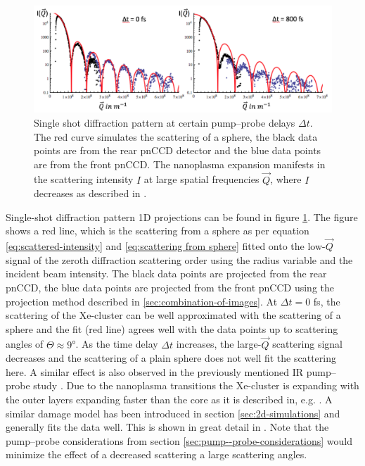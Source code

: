 \begin{figure}
	\centering
		\includegraphics[width=1.0\textwidth]{images/results/Xe-diff-pattern.png}
	\caption[Single-shot diffraction pattern of Xe-cluster at varying time delays]{Single shot diffraction pattern at certain pump--probe delays $\Delta t$. The red curve simulates the scattering of a sphere, the black data points are from the rear pnCCD detector and the blue data points are from the front pnCCD. The nanoplasma expansion manifests in the scattering intensity $I$ at large spatial frequencies $\vec{Q}$, where $I$ decreases as described in \citep{Gorkhover-2016-NatPho}.}
	\label{fig:Xe-only-diff-pattern}
\end{figure}
Single-shot diffraction pattern 1D projections can be found in figure \ref{fig:Xe-only-diff-pattern}. The figure shows a red line, which is the scattering from a sphere as per equation \eqref{eq:scattered-intensity} and \eqref{eq:scattering from sphere} fitted onto the low-$\vec{Q}$ signal of the zeroth diffraction scattering order using the radius variable and the incident beam intensity. The black data points are projected from the rear pnCCD, the blue data points are projected from the front pnCCD using the projection method described in \ref{sec:combination-of-images}. At $\Delta t=0$ fs, the scattering of the Xe-cluster can be well approximated with the scattering of a sphere and the fit (red line) agrees well with the data points up to scattering angles of $\Theta \approx 9$°. As the time delay $\Delta t$ increases, the large-$\vec{Q}$ scattering signal decreases and the scattering of a plain sphere does not well fit the scattering here. A similar effect is also observed in the previously mentioned IR pump--probe study \citep{Gorkhover-2016-NatPho}. Due to the nanoplasma transitions the Xe-cluster is expanding with the outer layers expanding faster than the core as it is described in, e.g. \citep{Hau-Riege-2004-PRE}. A similar damage model has been introduced in section \ref{sec:2d-simulations} and generally fits the data well. This is shown in great detail in \citep{Gorkhover-2016-NatPho,Gorkhover-2014-Thesis}. Note that the pump--probe considerations from section \ref{sec:pump--probe-considerations} would minimize the effect of a decreased scattering a large scattering angles.\\
